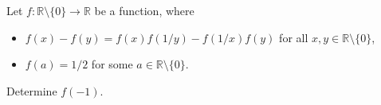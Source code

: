 Let $f\colon\mathbb{R}\setminus\{0\} \rightarrow\mathbb{R}$ be a function, where
\begin{itemize}
    \item $f(x)-f(y)=f(x)f(1/y)-f(1/x)f(y)$ for all $x,y \in \mathbb{R}\setminus\{0\}$,
    \item $f(a)=1/2$ for some $a \in\mathbb{R}\setminus\{0\}$.
\end{itemize}
Determine $f(-1)$.
